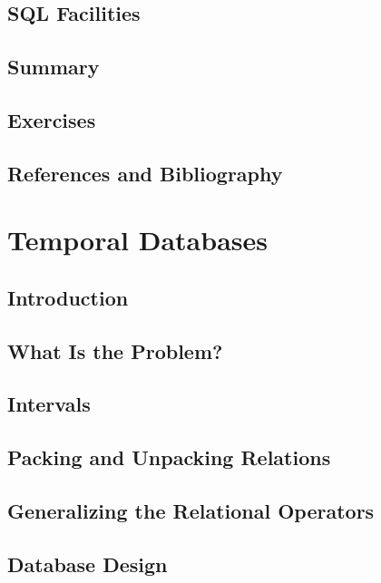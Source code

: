 \documentclass{book}
\begin{document}
\section{SQL Facilities}

\section{Summary}

\section{Exercises}

\section{References and Bibliography}
















\chapter{Temporal Databases}

\section{Introduction}

\section{What Is the Problem?}

\section{Intervals}

\section{Packing and Unpacking Relations}

\section{Generalizing the Relational Operators}

\section{Database Design}
\end{document}
